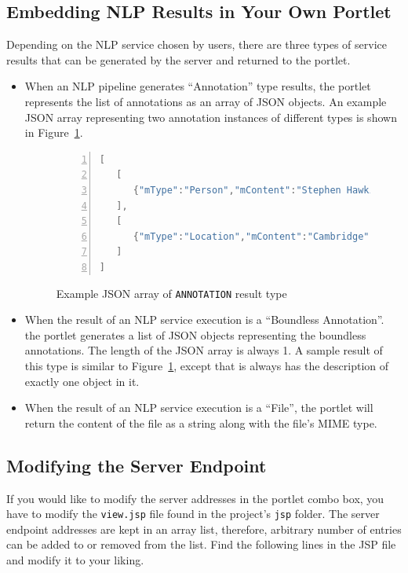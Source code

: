 \subsection{Embedding NLP Results in Your Own Portlet}
Depending on the NLP service chosen by users, there are three types of service results that can be generated by the \sa server and returned to the portlet.

\begin{itemize}
\item When an NLP pipeline generates ``Annotation'' type results, the \sa portlet represents the list of annotations as an array of JSON objects. An example JSON array representing two annotation instances of different types is shown in Figure~\ref{list:json_annot}.
\begin{figure}[h!]
\centering
\begin{lstlisting}[language=Java,numbers=left,xleftmargin=4mm,columns=flexible]
[
   [
      {"mType":"Person","mContent":"Stephen Hawking","mFeatures":{"gender":"male"},"mStart":0,"mEnd":15},
   ],
   [
      {"mType":"Location","mContent":"Cambridge","mFeatures":{"locType":"city"},"mStart":240,"mEnd":249},
   ]
]
\end{lstlisting}
\caption{Example JSON array of \texttt{ANNOTATION} result type}
\label{list:json_annot}
\end{figure}

\item When the result of an NLP service execution is a ``Boundless Annotation''. the \sa portlet generates a list of JSON objects representing the boundless annotations. The length of the JSON array is always 1. A sample result of this type is similar to Figure~\ref{list:json_annot}, except that is always has the description of exactly one object in it.
\item When the result of an NLP service execution is a ``File'', the \sa portlet will return the content of the file as a string along with the file's MIME type.
\end{itemize}

\subsection{Modifying the \sa Server Endpoint}
If you would like to modify the \sa server addresses in the portlet combo box, you have to modify the \texttt{view.jsp} file found in the project's \texttt{jsp} folder. The server endpoint addresses are kept in an array list, therefore, arbitrary number of entries can be added to or removed from the list. Find the following lines in the JSP file and modify it to your liking.

